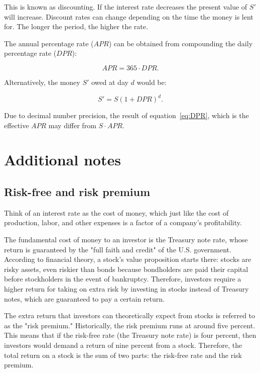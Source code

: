 This is known as discounting. If the interest rate decreases the present value of $S'$ will increase. Discount rates can change depending on the time the money is lent for. The longer the period, the higher the rate.

The annual percentage rate ($APR$) can be obtained from compounding the daily percentage rate ($DPR$):

\begin{equation}\label{eq:APR}
APR = 365 \cdot DPR .
\end{equation}

Alternatively, the money $S'$ owed at day $d$ would be:

\begin{equation}\label{eq:DPR}
S' = S (1+DPR)^d.
\end{equation}

Due to decimal number precision, the result of equation~\ref{eq:DPR}, which is the effective $APR$ may differ from $S\cdot APR$.

\section{Additional notes}

\subsection{Risk-free and risk premium}
Think of an interest rate as the cost of money, which just like the cost of production, labor, and other expenses is a factor of a company's profitability.

The fundamental cost of money to an investor is the Treasury note rate, whose return is guaranteed by the "full faith and credit" of the U.S. government. According to financial theory, a stock's value proposition starts there: stocks are risky assets, even riskier than bonds because bondholders are paid their capital before stockholders in the event of bankruptcy. Therefore, investors require a higher return for taking on extra risk by investing in stocks instead of Treasury notes, which are guaranteed to pay a certain return.

The extra return that investors can theoretically expect from stocks is referred to as the "risk premium." Historically, the risk premium runs at around five percent. This means that if the risk-free rate (the Treasury note rate) is four percent, then investors would demand a return of nine percent from a stock. Therefore, the total return on a stock is the sum of two parts: the risk-free rate and the risk premium.


